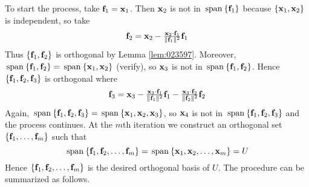 To start the process, take $\textbf{f}_{1} = \textbf{x}_{1}$. Then $\textbf{x}_{2}$ is not in $\thinspace\operatorname{span\medspace}\{\textbf{f}_{1}\}$ because $\{\textbf{x}_{1}, \textbf{x}_{2}\}$ is independent, so take
\begin{equation*}
\textbf{f}_{2} = \textbf{x}_{2} - \tfrac{\textbf{x}_{2} \cdot \textbf{f}_{1}}{\| \textbf{f}_{1} \|^2}\textbf{f}_{1}
\end{equation*}
Thus $\{\textbf{f}_{1}, \textbf{f}_{2}\}$ is orthogonal by Lemma \ref{lem:023597}. Moreover, $\thinspace\operatorname{span\medspace}\{\textbf{f}_{1}, \textbf{f}_{2}\} = \thinspace\operatorname{span\medspace}\{\textbf{x}_{1}, \textbf{x}_{2}\}$ (verify), so $\textbf{x}_{3}$ is not in $\thinspace\operatorname{span\medspace}\{\textbf{f}_{1}, \textbf{f}_{2}\}$. Hence $\{\textbf{f}_{1}, \textbf{f}_{2}, \textbf{f}_{3}\}$ is orthogonal where
\begin{equation*}
\textbf{f}_{3} = \textbf{x}_{3} - \tfrac{\textbf{x}_{3} \cdot \textbf{f}_{1}}{\| \textbf{f}_{1} \|^2}\textbf{f}_{1} - \tfrac{\textbf{x}_{3} \cdot \textbf{f}_{2}}{\| \textbf{f}_{2} \|^2}\textbf{f}_{2}
\end{equation*}
Again, $\thinspace\operatorname{span\medspace}\{\textbf{f}_{1}, \textbf{f}_{2}, \textbf{f}_{3}\} = \thinspace\operatorname{span\medspace}\{\textbf{x}_{1}, \textbf{x}_{2}, \textbf{x}_{3}\}$, so $\textbf{x}_{4}$ is not in $\thinspace\operatorname{span\medspace}\{\textbf{f}_{1}, \textbf{f}_{2}, \textbf{f}_{3}\}$ and the process continues. At the $m$th iteration we construct an orthogonal set $\{\textbf{f}_{1}, \dots , \textbf{f}_{m}\}$ such that
\begin{equation*}
\thinspace\operatorname{span\medspace}\{\textbf{f}_{1}, \textbf{f}_{2}, \dots, \textbf{f}_{m}\} = \thinspace\operatorname{span\medspace}\{\textbf{x}_{1}, \textbf{x}_{2}, \dots, \textbf{x}_{m}\} = U
\end{equation*}
Hence $\{\textbf{f}_{1}, \textbf{f}_{2}, \dots , \textbf{f}_{m}\}$ is the desired orthogonal basis of $U$. The procedure can be summarized as follows.

